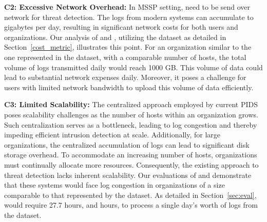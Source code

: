 \smallskip
\noindent
\textbf{C2: Excessive Network Overhead:} In MSSP setting, \logs need to be send over network for threat detection. The logs from modern systems can accumulate to gigabytes per day, resulting in significant network costs for both users and organizations. Our analysis of \flash and \kairos, utilizing the \optc dataset as detailed in Section~\ref{cost_metric}, illustrates this point. For an organization similar to the one represented in the \optc dataset, with a comparable number of hosts, the total volume of logs transmitted daily would reach 1000 GB. This volume of data could lead to substantial network expenses daily. Moreover, it poses a challenge for users with limited network bandwidth to upload this volume of data efficiently.
    

\smallskip
\noindent
\textbf{C3: Limited Scalability:} The centralized approach employed by current PIDS poses scalability challenges as the number of hosts within an organization grows. Such centralization serves as a bottleneck, leading to log congestion and thereby impeding efficient intrusion detection at scale. Additionally, for large organizations, the centralized accumulation of logs can lead to significant disk storage overhead. To accommodate an increasing number of hosts, organizations must continually allocate more resources. Consequently, the existing approach to threat detection lacks inherent scalability. Our evaluations of \flash and \kairos demonstrate that these systems would face log congestion in organizations of a size comparable to that represented by the \optc dataset. As detailed in Section~\ref{sec:eval}, \flash would require 27.7 hours, and  hours, to process a single day's worth of logs from the \optc dataset.
    
